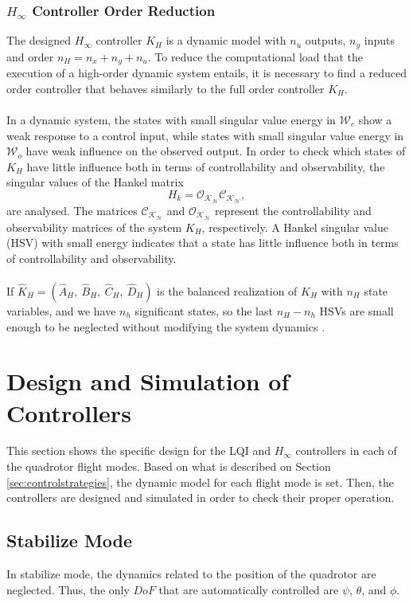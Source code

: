 \subsubsection{$H_\infty$ Controller Order Reduction}
The designed $H_{\infty}$ controller $K_H$ is a dynamic model with $n_u$ outputs, $n_y$ inputs and
order $n_H = n_{x} + n_{y} + n_{u}$. To reduce the computational load that the execution of a high-order dynamic system entails, it is necessary to find a reduced order controller that behaves similarly to the full order controller $K_H$. 
\\\\
In a dynamic system, the states with small singular value energy in $\mathcal{W}_{c}$ show a weak response to a control input, while states with small singular value energy in $\mathcal{W}_{o}$ have weak influence on the observed output. In order to check which states of $K_H$ have little influence both in terms of controllability and observability, the singular values of the Hankel matrix
\begin{equation}
H_{k} = \mathcal{O_{K_H}}\mathcal{C_{K_H}},
\end{equation}
are analysed. The matrices $\mathcal{C_{K_H}}$ and $\mathcal{O_{K_H}}$ represent the controllability and observability matrices of the system $K_H$, respectively. A Hankel singular value (HSV) with small energy indicates that a state has little influence both in terms of controllability and observability.
\\\\
If $\hat{K}_{H}=(\hat{A}_H,\ \hat{B}_H,\ \hat{C}_H,\ \hat{D}_H)$ is the balanced realization of $K_H$ with $n_H$ state variables, and we have $n_h$ significant states, so the last $n_{H}-n_{h}$ HSVs are small enough to be neglected without modifying the system dynamics \cite{Skogestad2005}. 

\section{Design and Simulation of Controllers}
\label{sec:controldesign}
This section shows the specific design for the LQI and $H_\infty$ controllers in each of the quadrotor flight modes. Based on what is described on Section \ref{sec:controlstrategies}, the dynamic model for each flight mode is set. Then, the controllers are designed and simulated in order to check their proper operation.
\subsection{Stabilize Mode}
In stabilize mode, the dynamics related to the position of the quadrotor are neglected. Thus, the only $DoF$ that are automatically controlled are $\psi$, $\theta$, and $\phi$.
